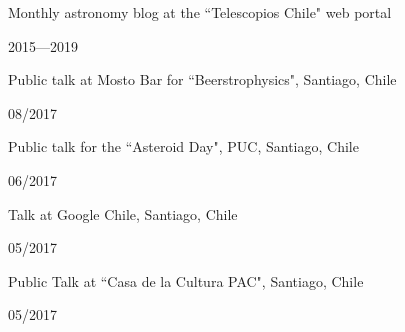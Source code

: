 \documentclass[12pt, a4paper]{article} %
\begin{document}
\vspace{0.2cm}

\begin{minipage}[t]{0.7\textwidth}
\begin{flushleft}%
  \setlength{\leftskip}{0.2cm}%
Monthly astronomy blog at the ``Telescopios Chile" web portal
\end{flushleft}
\end{minipage}
\begin{minipage}[t]{0.3\textwidth}
\hfill 2015---2019
\end{minipage}

\vspace{0.2cm}

\begin{minipage}[t]{0.7\textwidth}
\begin{flushleft}%
  \setlength{\leftskip}{0.2cm}%
Public talk at Mosto Bar for ``Beerstrophysics", Santiago, Chile
\end{flushleft}
\end{minipage}
\begin{minipage}[t]{0.3\textwidth}
\hfill 08/2017
\end{minipage}

\vspace{0.2cm}

\begin{minipage}[t]{0.7\textwidth}
\begin{flushleft}%
  \setlength{\leftskip}{0.2cm}%
Public talk for the ``Asteroid Day", PUC, Santiago, Chile
\end{flushleft}
\end{minipage}
\begin{minipage}[t]{0.3\textwidth}
\hfill 06/2017
\end{minipage}

\vspace{0.2cm}

\begin{minipage}[t]{0.7\textwidth}
\begin{flushleft}%
  \setlength{\leftskip}{0.2cm}%
Talk at Google Chile, Santiago, Chile
\end{flushleft}
\end{minipage}
\begin{minipage}[t]{0.3\textwidth}
\hfill 05/2017
\end{minipage}

\vspace{0.2cm}

\begin{minipage}[t]{0.7\textwidth}
\begin{flushleft}%
  \setlength{\leftskip}{0.2cm}%
Public Talk at ``Casa de la Cultura PAC", Santiago, Chile
\end{flushleft}
\end{minipage}
\begin{minipage}[t]{0.3\textwidth}
\hfill 05/2017
\end{minipage}
\end{document}
